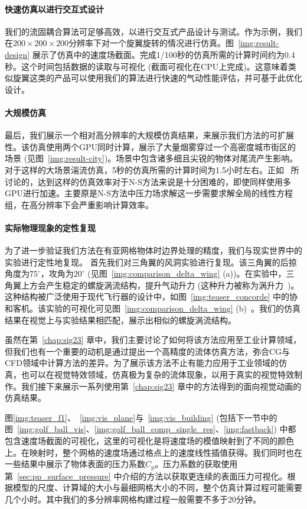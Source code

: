 \paragraph{快速仿真以进行交互式设计}
我们的流固耦合算法可足够高效，以进行交互式产品设计与测试。作为示例，我们在$200 \!\times\! 200 \!\times\! 200$分辨率下对一个旋翼旋转的情况进行仿真。图~\ref{img:result-design} 展示了仿真中的速度场截面。完成1/100秒的仿真所需的计算时间约为0.4秒。这个时间包括数据的读取与可视化 (截面可视化在CPU上完成)。这意味着类似旋翼这类的产品可以使用我们的算法进行快速的气动性能评估，并可基于此优化设计。

\paragraph{大规模仿真}
最后，我们展示一个相对高分辨率的大规模仿真结果，来展示我们方法的可扩展性。该仿真使用两个GPU同时计算，展示了大量烟雾穿过一个高密度城市街区的场景 (见图~\ref{img:result-city})。场景中包含诸多细且尖锐的物体对尾流产生影响。对于这样的大场景湍流仿真，5秒的仿真所需的计算时间为1.5小时左右。正如~\citet{Li-2020} 所讨论的，达到这样的仿真效率对于N-S方法来说是十分困难的，即使同样使用多GPU进行加速。主要原是N-S方法中压力场求解这一步需要求解全局的线性方程组，在高分辨率下会严重影响计算效率。

\paragraph{实际物理现象的定性复现}
为了进一步验证我们方法在有亚网格物体时边界处理的精度，我们与现实世界中的实验进行定性地复现。
首先我们对三角翼的风洞实验进行复现。该三角翼的后掠角度为$75^\circ$，攻角为$20^\circ$ (见图~\ref{img:comparison_delta_wing} (a))。在实验中，三角翼上方会产生稳定的螺旋涡流结构，提升气动升力 (这种升力被称为涡升力~\citep{anderson2010aircraft})。这种结构被广泛使用于现代飞行器的设计中，如图~\ref{img:teaser_concorde} 中的协和客机。该实验的可视化可见图~\ref{img:comparison_delta_wing} (b)~\citep{Delery:2001}。我们的仿真结果在视觉上与实验结果相匹配，展示出相似的螺旋涡流结构。

虽然在第~\ref{chap:sig23} 章中，我们主要讨论了如何将该方法应用至工业计算领域，但我们也有一个重要的动机是通过提出一个高精度的流体仿真方法，弥合CG与CFD领域中计算方法的差异。为了展示该方法不止有能力应用于工业领域的仿真，也可以在视觉特效领域，仿真极为复杂的流体现象，以用于真实的视觉特效制作。我们接下来展示一系列使用第~\ref{chap:sig23} 章中的方法得到的面向视觉动画的仿真结果。

图\ref{img:teaser_f1}、~\ref{img:vis_plane}与~\ref{img:vis_building} (包括下一节中的图~\ref{img:golf_ball_vis}、\ref{img:golf_ball_comp_single_res}、\ref{img:fastback}) 中都包含速度场截面的可视化，这里的可视化是将速度场的模值映射到了不同的颜色上。在映射时，整个网格的速度场通过格点上的速度线性插值获得。我们同时也在一些结果中展示了物体表面的压力系数$C_\text{p}$。压力系数的获取使用第~\ref{sec:pp_surface_pressure} 中介绍的方法以获取更连续的表面压力可视化。根据模型的尺度、计算域的大小与最细网格大小的不同，整个仿真计算过程可能需要几个小时。其中我们的多分辨率网格构建过程一般需要不多于20分钟。


